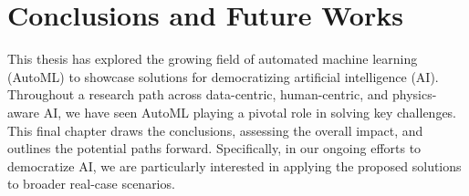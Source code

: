 \chapter{Conclusions and Future Works}
\label{epilogue:conclusions}



This thesis has explored the growing field of automated machine learning (AutoML) to showcase solutions for democratizing artificial intelligence (AI).
Throughout a research path across data-centric, human-centric, and physics-aware AI, we have seen AutoML playing a pivotal role in solving key challenges.
This final chapter draws the conclusions, assessing the overall impact,
and outlines the potential paths forward.
Specifically, in our ongoing efforts to democratize AI, we are particularly interested in applying the proposed solutions to broader real-case scenarios.




